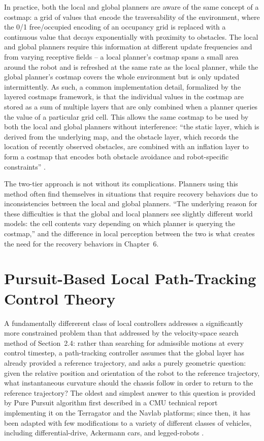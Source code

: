 In practice, both the local and global planners are aware of the same concept of a costmap: a grid of values that encode the traversability of the environment, where the 0/1 free/occupied encoding of an occupancy grid is replaced with a continuous value that decays exponentially with proximity to obstacles. The local and global planners require this information at different update frequencies and from varying receptive fields -- a local planner's costmap spans a small area around the robot and is refreshed at the same rate as the local planner, while the global planner's costmap covers the whole environment but is only updated intermittently. As such, a common implementation detail, formalized by the layered costmaps framework, is that the individual values in the costmap are stored as a sum of multiple layers that are only combined when a planner queries the value of a particular grid cell. This allows the same costmap to be used by both the local and global planners without interference: ``the static layer, which is derived from the underlying map, and the obstacle layer, which records the location of recently observed obstacles, are combined with an inflation layer to form a costmap that encodes both obstacle avoidance and robot-specific constraints'' \cite{lu2014layered}.

The two-tier approach is not without its complications. Planners using this method often find themselves in situations that require recovery behaviors due to inconsistencies between the local and global planners. ``The underlying reason for these difficulties is that the global and local planners see slightly different world models: the cell contents vary depending on which planner is querying the costmap,'' and the difference in local perception between the two is what creates the need for the recovery behaviors in Chapter~6.

\section{Pursuit-Based Local Path-Tracking Control Theory}

A fundamentally differerent class of local controllers addresses a significantly more constrained problem than that addressed by the velocity-space search method of Section~2.4: rather than searching for admissible motions at every control timestep, a path-tracking controller assumes that the global layer has already provided a reference trajectory, and asks a purely geometric question: given the relative position and orientation of the robot to the reference trajectory, what instantaneous curvature should the chassis follow in order to return to the reference trajectory? The oldest and simplest answer to this question is provided by Pure Pursuit algorithm first described in a CMU technical report implementing it on the Terragator and the Navlab platforms; since then, it has been adapted with few modifications to a variety of different classes of vehicles, including differential-drive, Ackermann cars, and legged-robots \cite{coulter1992implementation}.

